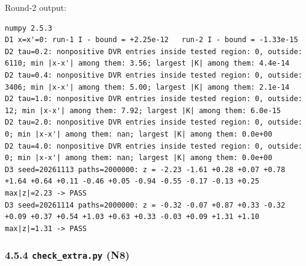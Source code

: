 \documentclass[11pt,a4paper]{article}
\begin{document}
Round-2 output:

\begin{lstlisting}
numpy 2.5.3
D1 x=x'=0: run-1 I - bound = +2.25e-12   run-2 I - bound = -1.33e-15
D2 tau=0.2: nonpositive DVR entries inside tested region: 0, outside: 6110; min |x-x'| among them: 3.56; largest |K| among them: 4.4e-14
D2 tau=0.4: nonpositive DVR entries inside tested region: 0, outside: 3406; min |x-x'| among them: 5.00; largest |K| among them: 2.1e-14
D2 tau=1.0: nonpositive DVR entries inside tested region: 0, outside: 12; min |x-x'| among them: 7.92; largest |K| among them: 6.0e-15
D2 tau=2.0: nonpositive DVR entries inside tested region: 0, outside: 0; min |x-x'| among them: nan; largest |K| among them: 0.0e+00
D2 tau=4.0: nonpositive DVR entries inside tested region: 0, outside: 0; min |x-x'| among them: nan; largest |K| among them: 0.0e+00
D3 seed=20261113 paths=2000000: z = -2.23 -1.61 +0.28 +0.07 +0.78 +1.64 +0.64 +0.11 -0.46 +0.05 -0.94 -0.55 -0.17 -0.13 +0.25  max|z|=2.23 -> PASS
D3 seed=20261114 paths=2000000: z = -0.32 -0.07 +0.87 +0.33 -0.32 +0.09 +0.37 +0.54 +1.03 +0.63 +0.33 -0.03 +0.09 +1.31 +1.10  max|z|=1.31 -> PASS
\end{lstlisting}

\hypertarget{check_extra.py-n8}{%
\subsubsection{\texorpdfstring{4.5.4 \texttt{check\_extra.py} (N8)}{4.5.4  (N8)}}\label{check_extra.py-n8}}
\end{document}
